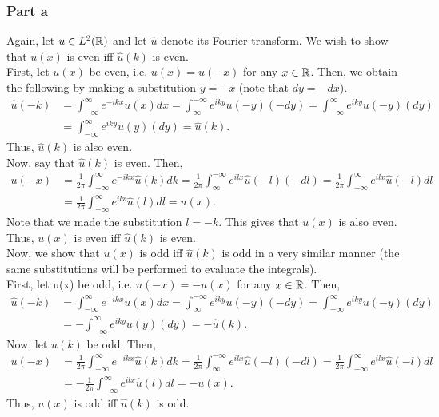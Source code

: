 \documentclass{article}
\begin{document}
\subsubsection{Part a}
Again, let $u\in L^2(\mathbb{R})$ and let $\hat{u}$ denote its Fourier transform. We wish to show that $u(x)$ is even iff $\hat{u}(k)$ is even. \\
First, let $u(x)$ be even, i.e. $u(x)=u(-x)$ for any $x\in\mathbb{R}$. Then, we obtain the following by making a substitution $y=-x$ (note that $dy=-dx$).
\[
\begin{split}
\hat{u}(-k)&=\int_{-\infty}^\infty e^{-ikx}u(x)dx = \int_{\infty}^{-\infty} e^{iky}u(-y)(-dy)=\int_{-\infty}^{\infty} e^{iky}u(-y)(dy)\\&=\int_{-\infty}^{\infty} e^{iky}u(y)(dy)=\hat{u}(k).
\end{split}
\]
Thus, $\hat{u}(k)$ is also even.\\
Now, say that $\hat{u}(k)$ is even. Then, 
\[
\begin{split}
u(-x)&=\frac{1}{2\pi}\int_{-\infty}^{\infty}e^{-ikx}\hat{u}(k)dk=\frac{1}{2\pi}\int_{\infty}^{-\infty}e^{ilx}\hat{u}(-l)(-dl)=\frac{1}{2\pi}\int_{-\infty}^{\infty}e^{ilx}\hat{u}(-l)dl\\&=\frac{1}{2\pi}\int_{-\infty}^{\infty}e^{ilx}\hat{u}(l)dl=u(x).
\end{split}
\]
Note that we made the substitution $l=-k$. This gives that $u(x)$ is also even. Thus, $u(x)$ is even iff $\hat{u}(k)$ is even.\\
Now, we show that $u(x)$ is odd iff $\hat{u}(k)$ is odd in a very similar manner (the same substitutions will be performed to evaluate the integrals). \\
First, let u(x) be odd, i.e. $u(-x)=-u(x)$ for any $x\in\mathbb{R}$. Then, 
\[
\begin{split}
\hat{u}(-k)&=\int_{-\infty}^\infty e^{-ikx}u(x)dx = \int_{\infty}^{-\infty} e^{iky}u(-y)(-dy)=\int_{-\infty}^{\infty} e^{iky}u(-y)(dy)\\&=-\int_{-\infty}^{\infty} e^{iky}u(y)(dy)=-\hat{u}(k).
\end{split}
\]
Now, let $\hat{u}(k)$ be odd. Then, 
\[
\begin{split}
u(-x)&=\frac{1}{2\pi}\int_{-\infty}^{\infty}e^{-ikx}\hat{u}(k)dk=\frac{1}{2\pi}\int_{\infty}^{-\infty}e^{ilx}\hat{u}(-l)(-dl)=\frac{1}{2\pi}\int_{-\infty}^{\infty}e^{ilx}\hat{u}(-l)dl\\&=-\frac{1}{2\pi}\int_{-\infty}^{\infty}e^{ilx}\hat{u}(l)dl=-u(x).
\end{split}
\]
Thus, $u(x)$ is odd iff $\hat{u}(k)$ is odd.
\end{document}
